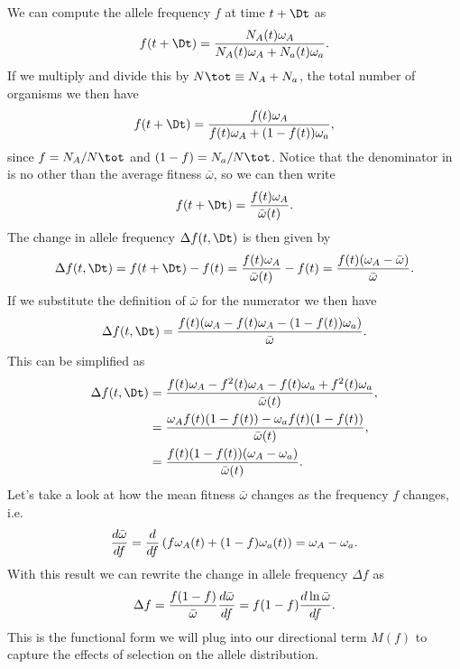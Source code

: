 We can compute the allele frequency $f$ at time $t + \Dt$ as
\begin{equation}
  f(t + \Dt) = {N_A(t) \omega_A \over N_A(t) \omega_A + N_a(t) \omega_a}.
\end{equation}
If we multiply and divide this by $N\tot \equiv N_A + N_a$, the total number of
organisms we then have
\begin{equation}
  f(t + \Dt) = {f(t) \omega_A \over f(t) \omega_A + (1 - f(t)) \omega_a},
  \label{eq_f_tdt}
\end{equation}
since $f = N_A/N\tot$ and $(1 - f) = N_a/N\tot$. Notice that the denominator in
 is no other than the average fitness $\bar{\omega}$, so we can
then write
\begin{equation}
  f(t + \Dt) = {f(t) \omega_A \over \bar{\omega}(t)}.
\end{equation}
The change in allele frequency $\Delta f(t, \Dt)$ is then given by
\begin{equation}
  \Delta f(t, \Dt) = f(t + \Dt) - f(t) = {f(t) \omega_A \over \bar{\omega}(t)}
  - f(t) = {f(t) (\omega_A - \bar{\omega}) \over \bar{\omega}}.
\end{equation}
If we substitute the definition of $\bar{\omega}$ for the numerator we then have
\begin{equation}
  \Delta f(t, \Dt) = {f(t) (\omega_A - f(t) \omega_A -
  (1 - f(t)) \omega_a) \over
  \bar{\omega}}.
\end{equation}
This can be simplified as
\begin{align}
  \Delta f(t, \Dt) &= {f(t) \omega_A - f^2(t)\omega_A
  - f(t) \omega_a + f^2(t) \omega_a \over \bar{\omega}(t)}, \\
  &= {\omega_A f(t)(1 - f(t)) - \omega_a f(t) (1 - f(t)) \over
  \bar{\omega}(t)}, \\
  &= {f(t)(1 - f(t))(\omega_A - \omega_a) \over \bar{\omega}(t)}.
\end{align}
Let's take a look at how the mean fitness $\bar{\omega}$ changes as the
frequency $f$ changes, i.e.
\begin{equation}
  {d \bar{\omega} \over df} = {d \over df }
  \left(f \omega_A(t) + (1 - f) \omega_a(t)  \right) =
  \omega_A - \omega_a.
\end{equation}
With this result we can rewrite the change in allele frequency $\Delta f$ as
\begin{equation}
  \Delta f = {f (1 - f) \over \bar{\omega}} {d \bar{\omega} \over df} =
  f (1 - f) {d \ln \bar{\omega} \over df}.
\end{equation}
This is the functional form we will plug into our directional term $M(f)$ to
capture the effects of selection on the allele distribution.

